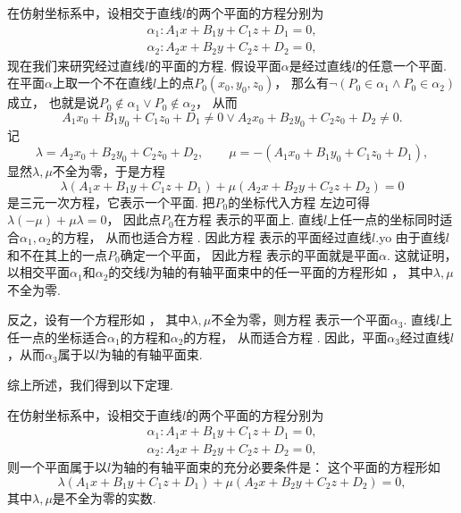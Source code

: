 在仿射坐标系中，设相交于直线\(l\)的两个平面的方程分别为\[
	\begin{split}
		\alpha_1: A_1 x + B_1 y + C_1 z + D_1 = 0, \\
		\alpha_2: A_2 x + B_2 y + C_2 z + D_2 = 0,
	\end{split}
\]
现在我们来研究经过直线\(l\)的平面的方程.
假设平面\(\alpha\)是经过直线\(l\)的任意一个平面.
在平面\(\alpha\)上取一个不在直线\(l\)上的点\(P_0(x_0,y_0,z_0)\)，
那么有\(\neg(P_0 \in \alpha_1 \land P_0 \in \alpha_2)\)成立，
也就是说\(P_0 \notin \alpha_1 \lor P_0 \notin \alpha_2\)，
从而\[
	A_1 x_0 + B_1 y_0 + C_1 z_0 + D_1 \neq 0
	\lor
	A_2 x_0 + B_2 y_0 + C_2 z_0 + D_2 \neq 0.
\]
记\[
	\lambda = A_2 x_0 + B_2 y_0 + C_2 z_0 + D_2, \qquad
	\mu = -(A_1 x_0 + B_1 y_0 + C_1 z_0 + D_1),
\]
显然\(\lambda,\mu\)不全为零，于是方程
\begin{equation}\label{equation:解析几何.由两个相交平面确定的有轴平面束方程}
	\lambda	(A_1 x + B_1 y + C_1 z + D_1)
	+ \mu	(A_2 x + B_2 y + C_2 z + D_2) = 0
\end{equation}
是三元一次方程，它表示一个平面.
把\(P_0\)的坐标代入方程 
左边可得\(\lambda(-\mu)+\mu\lambda=0\)，
因此点\(P_0\)在方程  表示的平面上.
直线\(l\)上任一点的坐标同时适合\(\alpha_1,\alpha_2\)的方程，
从而也适合方程 .
因此方程 
表示的平面经过直线\(l\).yo
由于直线\(l\)和不在其上的一点\(P_0\)确定一个平面，
因此方程 
表示的平面就是平面\(\alpha\).
这就证明，以相交平面\(\alpha_1\)和\(\alpha_2\)的交线\(l\)为轴的有轴平面束中的任一平面的方程形如 ，
其中\(\lambda,\mu\)不全为零.

反之，设有一个方程形如 ，
其中\(\lambda,\mu\)不全为零，则方程 
表示一个平面\(\alpha_3\).
直线\(l\)上任一点的坐标适合\(\alpha_1\)的方程和\(\alpha_2\)的方程，
从而适合方程 .
因此，平面\(\alpha_3\)经过直线\(l\)，从而\(\alpha_3\)属于以\(l\)为轴的有轴平面束.

综上所述，我们得到以下定理.
\begin{theorem}
在仿射坐标系中，设相交于直线\(l\)的两个平面的方程分别为\[
	\begin{split}
		\alpha_1: A_1 x + B_1 y + C_1 z + D_1 = 0, \\
		\alpha_2: A_2 x + B_2 y + C_2 z + D_2 = 0,
	\end{split}
\]
则一个平面属于以\(l\)为轴的有轴平面束的充分必要条件是：
这个平面的方程形如\[
	\lambda	(A_1 x + B_1 y + C_1 z + D_1)
	+ \mu	(A_2 x + B_2 y + C_2 z + D_2) = 0,
\]
其中\(\lambda,\mu\)是不全为零的实数.
\end{theorem}

